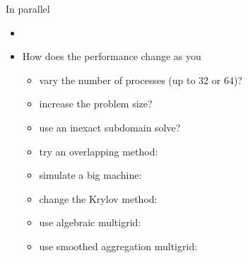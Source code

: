 \begin{frame}{In parallel}
  \begin{itemize}
  \item {}
  \item How does the performance change as you
    \begin{itemize}
    \item vary the number of processes (up to 32 or 64)?
    \item increase the problem size?
    \item use an inexact subdomain solve?
    \item try an overlapping method: 
    \item simulate a big machine: 
    \item change the Krylov method: 
    \item use algebraic multigrid: 
    \item use smoothed aggregation multigrid: 
    \end{itemize}
  \end{itemize}
\end{frame}
